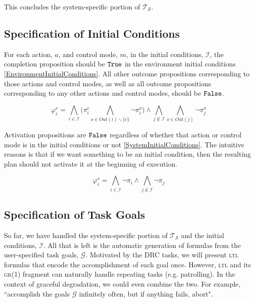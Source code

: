 This concludes the system-specific portion of $\mathcal{T_S}$.


\subsection{Specification of Initial Conditions}

For each action, $a$, and control mode, $m$, in the initial conditions, $\mathcal{I}$, the completion proposition should be $\mathtt{True}$ in the environment initial conditions \eqref{EnvironmentInitialConditions}.
All other outcome propositions corresponding to those actions and control modes, as well as all outcome propositions corresponding to any other actions and control modes, should be $\mathtt{False}$.

\begin{equation}\label{EnvironmentInitialConditions}
	\varphi_i^e = \bigwedge \limits_{i \in \mathcal{I}} \Big( \pi_i^c \bigwedge \limits_{o \in Out(i)\backslash \{c\}} \lnot \pi_i^o \Big) \wedge \bigwedge \limits_{j \not\in \mathcal{I}} \bigwedge \limits_{o \in Out(j)} \lnot \pi_j^o
\end{equation}

Activation propositions are $\mathtt{False}$ regardless of whether that action or control mode is in the initial conditions or not \eqref{SystemInitialConditions}.
The intuitive reasons is that if we want something to be an initial condition, then the resulting plan should not activate it at the beginning of execution.

\begin{equation}\label{SystemInitialConditions}
	\varphi_i^s = \bigwedge \limits_{i \in \mathcal{I}} \lnot \pi_i \wedge \bigwedge \limits_{j \not \in \mathcal{I}} \lnot \pi_j
\end{equation}



\subsection{Specification of Task Goals}

So far, we have handled the system-specific portion of $\mathcal{T_S}$ and the initial conditions, $\mathcal{I}$.
All that is left is the automatic generation of formulas from the user-specified task goals, $\mathcal{G}$.
Motivated by the DRC tasks, we will present \textsc{ltl} formulas that encode the accomplishment of each goal once.
However, \textsc{ltl} and its \textsc{gr(1)} fragment can naturally handle repeating tasks (e.g. patrolling).
In the context of graceful degradation, we could even combine the two.
For example, ``accomplish the goals $\mathcal{G}$ infinitely often, but if anything fails, abort".

